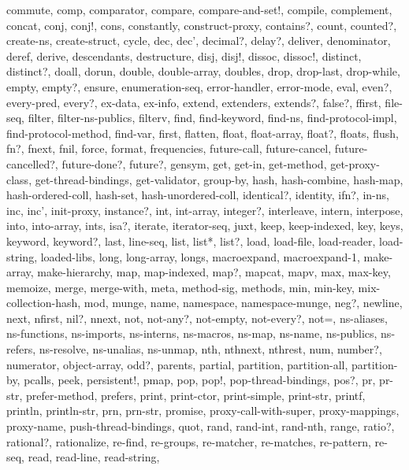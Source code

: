 {{    commute, comp, comparator, compare, compare-and-set!, compile, complement, %
    concat, conj, conj!, cons, constantly, construct-proxy, contains?, count, %
    counted?, create-ns, create-struct, cycle, dec, dec', decimal?, delay?, %
    deliver, denominator, deref, derive, descendants, destructure, disj, disj!, %
    dissoc, dissoc!, distinct, distinct?, doall, dorun, double, double-array, %
    doubles, drop, drop-last, drop-while, empty, empty?, ensure, %
    enumeration-seq, error-handler, error-mode, eval, even?, every-pred, every?, %
    ex-data, ex-info, extend, extenders, extends?, false?, ffirst, file-seq, %
    filter, filter-ns-publics, filterv, find, find-keyword, find-ns, %
    find-protocol-impl, find-protocol-method, find-var, first, flatten, float, %
    float-array, float?, floats, flush, fn?, fnext, fnil, force, format, %
    frequencies, future-call, future-cancel, future-cancelled?, future-done?, %
    future?, gensym, get, get-in, get-method, get-proxy-class, %
    get-thread-bindings, get-validator, group-by, hash, hash-combine, hash-map, %
    hash-ordered-coll, hash-set, hash-unordered-coll, identical?, identity, %
    ifn?, in-ns, inc, inc', init-proxy, instance?, int, int-array, integer?, %
    interleave, intern, interpose, into, into-array, ints, isa?, iterate, %
    iterator-seq, juxt, keep, keep-indexed, key, keys, keyword, keyword?, last, %
    line-seq, list, list*, list?, load, load-file, load-reader, load-string, %
    loaded-libs, long, long-array, longs, macroexpand, macroexpand-1, %
    make-array, make-hierarchy, map, map-indexed, map?, mapcat, mapv, max, %
    max-key, memoize, merge, merge-with, meta, method-sig, methods, min, %
    min-key, mix-collection-hash, mod, munge, name, namespace, namespace-munge, %
    neg?, newline, next, nfirst, nil?, nnext, not, not-any?, not-empty, %
    not-every?, not=, ns-aliases, ns-functions, ns-imports, ns-interns, %
    ns-macros, ns-map, ns-name, ns-publics, ns-refers, ns-resolve, ns-unalias, %
    ns-unmap, nth, nthnext, nthrest, num, number?, numerator, object-array, %
    odd?, parents, partial, partition, partition-all, partition-by, pcalls, %
    peek, persistent!, pmap, pop, pop!, pop-thread-bindings, pos?, pr, pr-str, %
    prefer-method, prefers, print, print-ctor, print-simple, print-str, printf, %
    println, println-str, prn, prn-str, promise, proxy-call-with-super, %
    proxy-mappings, proxy-name, push-thread-bindings, quot, rand, rand-int, %
    rand-nth, range, ratio?, rational?, rationalize, re-find, re-groups, %
    re-matcher, re-matches, re-pattern, re-seq, read, read-line, read-string, %
}}

